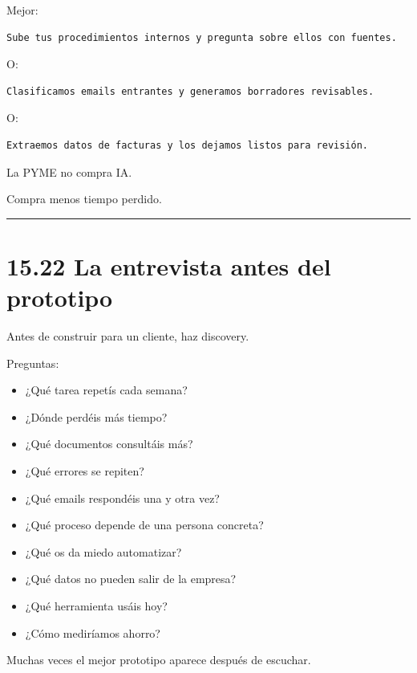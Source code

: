 Mejor:

\begin{lstlisting}
Sube tus procedimientos internos y pregunta sobre ellos con fuentes.
\end{lstlisting}

O:

\begin{lstlisting}
Clasificamos emails entrantes y generamos borradores revisables.
\end{lstlisting}

O:

\begin{lstlisting}
Extraemos datos de facturas y los dejamos listos para revisión.
\end{lstlisting}

La PYME no compra IA.

Compra menos tiempo perdido.

\begin{center}\rule{0.5\linewidth}{0.5pt}\end{center}

\section{15.22 La entrevista antes del
prototipo}\label{la-entrevista-antes-del-prototipo}

Antes de construir para un cliente, haz discovery.

Preguntas:

\begin{itemize}
\tightlist
\item
  ¿Qué tarea repetís cada semana?
\item
  ¿Dónde perdéis más tiempo?
\item
  ¿Qué documentos consultáis más?
\item
  ¿Qué errores se repiten?
\item
  ¿Qué emails respondéis una y otra vez?
\item
  ¿Qué proceso depende de una persona concreta?
\item
  ¿Qué os da miedo automatizar?
\item
  ¿Qué datos no pueden salir de la empresa?
\item
  ¿Qué herramienta usáis hoy?
\item
  ¿Cómo mediríamos ahorro?
\end{itemize}

Muchas veces el mejor prototipo aparece después de escuchar.

